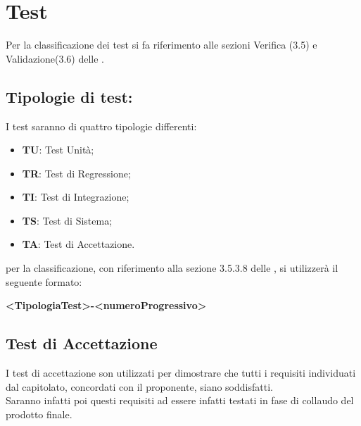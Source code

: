 \section{Test}
	Per la classificazione dei test si fa riferimento alle sezioni Verifica (3.5) e Validazione(3.6) delle .
	
	\subsection{Tipologie di test:}
		I test saranno di quattro tipologie differenti:
		\begin{itemize}
			\item \textbf{TU}: Test Unità;
			\item \textbf{TR}: Test di Regressione; 
			\item \textbf{TI}: Test di Integrazione; 
			\item \textbf{TS}: Test di Sistema;
			\item \textbf{TA}: Test di Accettazione.
		\end{itemize}
		per la classificazione, con riferimento alla sezione 3.5.3.8 delle , si utilizzerà il seguente formato:
		\begin{center}
			\textbf{<TipologiaTest>-<numeroProgressivo>}
		\end{center}
			
	\subsection{Test di Accettazione}
		I test di accettazione son utilizzati per dimostrare che tutti i requisiti individuati dal capitolato, concordati con il proponente, siano soddisfatti. \\
		Saranno infatti poi questi requisiti ad essere infatti testati in fase di collaudo del prodotto finale.
		
